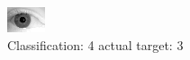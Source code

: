 \begin{figure}[h!]
\begin{center}
\includegraphics[width=0.60\columnwidth]{figures/ID2115_class_4_target_3.png}
\end{center}
\caption{ Classification: 4 actual target: 3}
\label{fig:ID2115_class_4_target_3}
\end{figure}
